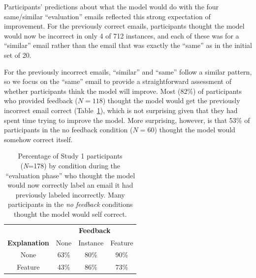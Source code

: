 
Participants' predictions about what the model would do with the four same/similar ``evaluation'' emails  reflected this strong expectation of improvement. 
For the previously correct emails, participants thought the model would now be incorrect in only 4 of 712 instances, and each of these was for a ``similar'' email rather than the email that was exactly the ``same'' as in the initial set of 20.

For the previously incorrect emails, ``similar'' and ``same'' follow a similar pattern, so we focus on the ``same'' email to provide a straightforward assessment of whether participants think the model will improve. 
%
Most (82\%) of participants who provided feedback ($N=118$) thought the model would get the previously incorrect email correct (Table~\ref{tab:study1eval}), which is not surprising given that they had spent time trying to improve the model.
%
More surprising, however, is that 53\% of  participants in the no feedback condition ($N=60$) thought the model would somehow correct itself. %

\begin{table}[t]
    \centering
    \begin{tabular}{cccc}
    \toprule
              & \multicolumn{3}{c}{{\bf Feedback}} \\
              \cline{2-4}
        {\bf Explanation} & None & Instance & Feature \\
         \midrule
        None & 63\% & 80\% & 90\% \\
        Feature & 43\% & 86\% & 73\% \\
        \bottomrule
    \end{tabular}
    \caption{Percentage of Study 1 participants (\textit{N}=178) by condition during the ``evaluation phase'' who thought the model would now correctly label an email it had previously labeled incorrectly. Many participants in the \textit{no feedback} conditions thought the model would self correct.}
    \label{tab:study1eval}
    \vspace{-15pt}
\end{table}

